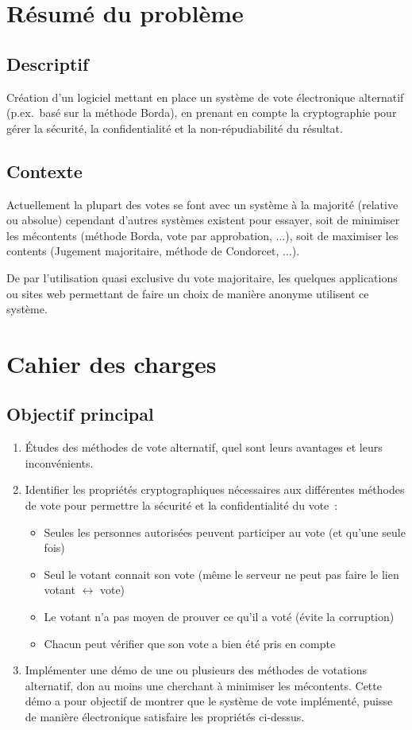 \documentclass[../report]{subfiles}
\begin{document}
\section{Résumé du problème}
\subsection{Descriptif}
Création d'un logiciel mettant en place un système de vote électronique alternatif (p.ex.~basé sur la méthode Borda), en prenant en compte la cryptographie pour gérer la sécurité, la confidentialité et la non-répudiabilité du résultat.

\subsection{Contexte}
Actuellement la plupart des votes se font avec un système à la majorité (relative ou absolue) cependant d'autres systèmes existent pour essayer, soit de minimiser les mécontents (méthode Borda, vote par approbation, ...), soit de maximiser les contents (Jugement majoritaire, méthode de Condorcet, ...).

De par l'utilisation quasi exclusive du vote majoritaire, les quelques applications ou sites web permettant de faire un choix de manière anonyme utilisent ce système.

\section{Cahier des charges}
\subsection{Objectif principal}\label{ssec:cdc:cdc:objprinc}
\begin{enumerate}
  \item Études des méthodes de vote alternatif, quel sont leurs avantages et leurs inconvénients.
  \item Identifier les propriétés cryptographiques nécessaires aux différentes méthodes de vote pour permettre la sécurité et la confidentialité du vote~:
    \begin{itemize}
      \item Seules les personnes autorisées peuvent participer au vote (et qu'une seule fois)
      \item Seul le votant connait son vote (même le serveur ne peut pas faire le lien votant $\longleftrightarrow$ vote)
      \item Le votant n'a pas moyen de prouver ce qu'il a voté (évite la corruption)
      \item Chacun peut vérifier que son vote a bien été pris en compte
    \end{itemize}
  \item Implémenter une démo de une ou plusieurs des méthodes de votations alternatif, don au moins une cherchant à minimiser les mécontents. Cette démo a pour objectif de montrer que le système de vote implémenté, puisse de manière électronique satisfaire les propriétés ci-dessus.
\end{enumerate}
\end{document}
